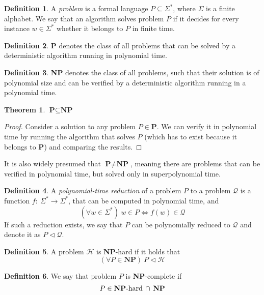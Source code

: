 \documentclass[thesis=M,english,hidelinks]{FITthesis}[2012/10/20]
\theoremstyle{definition}
\newtheorem{definition}{Definition}
\newtheorem{theorem}{Theorem}
\newcommand{\PC}{\textbf{P}\xspace}
\newcommand{\NP}{\textbf{NP}\xspace}
\newcommand{\NPH}{\textbf{NP}-hard\xspace}
\newcommand{\NPC}{\textbf{NP}-complete\xspace}
\begin{document}
\begin{definition}
    A \emph{problem} is a formal language $P \subseteq \Sigma^*$, where $\Sigma$ is a finite alphabet. We say
    that an algorithm solves problem $P$ if it decides for every instance $w \in \Sigma^*$ whether it belongs
    to $P$ in finite time.
\end{definition}

\begin{definition}
    \PC denotes the class of all problems that can be solved by a deterministic algorithm running in polynomial
    time.
\end{definition}

\begin{definition}
    \NP denotes the class of all problems, such that their solution is of polynomial size and can be verified by a
    deterministic algorithm running in a polynomial time.
\end{definition}

\begin{theorem}
    $\PC \subseteq \NP$
\end{theorem}

\begin{proof}
    Consider a solution to any problem $P \in \PC$. We can verify it in polynomial time by running the
    algorithm that solves $P$ (which has to exist because it belongs to \PC) and comparing the results.
\end{proof}

It is also widely presumed that $\PC \neq \NP$, meaning there are problems that can be verified in polynomial time,
but solved only in superpolynomial time.

\begin{definition}
    A \emph{polynomial-time reduction} of a problem $P$ to a problem $\mathcal{Q}$ is a function $f:\ \Sigma^*
    \rightarrow \Sigma^*$, that can be computed in polynomial time, and
    $$
    (\forall w \in \Sigma^*)\ w \in P \Leftrightarrow f(w) \in \mathcal{Q}
    $$
    If such a reduction exists, we say that $P$ can be polynomially reduced to $\mathcal{Q}$ and denote it as
    $P \lhd \mathcal{Q}$.
\end{definition}

\begin{definition}
    A problem $\mathcal{H}$ is \NPH if it holds that
    $$
    (\forall P \in \textbf{NP})\ P \lhd \mathcal{H}
    $$
\end{definition}

\begin{definition}
    We say that problem $P$ is \NPC if
    $$
    P \in \textrm{\textbf{NP}-hard}\,\cap\,\NP
    $$
\end{definition}
\end{document}
